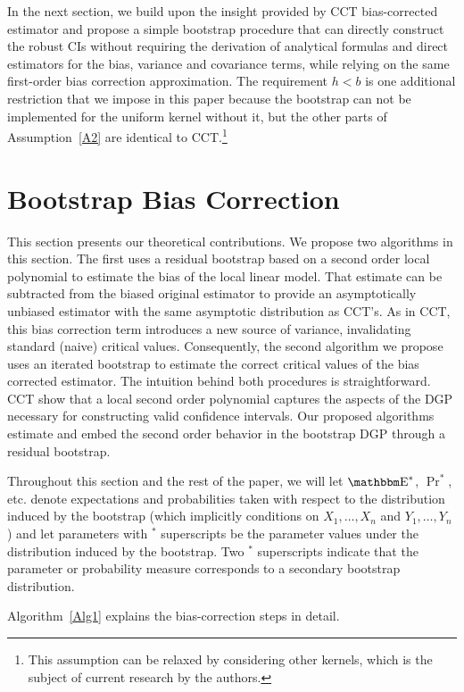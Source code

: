 \documentclass[12pt,fleqn]{article}
\begin{document}
In the next section, we build upon the insight provided by CCT bias-corrected
estimator and propose a simple bootstrap procedure that can directly construct
the robust CIs without requiring the derivation of analytical formulas and
direct estimators for the bias, variance and covariance terms, while relying on
the same first-order bias correction approximation. The requirement $h < b$ is
one additional restriction that we impose in this paper because the bootstrap
can not be implemented for the uniform kernel without it, but the other parts of
Assumption~\ref{A2} are identical to CCT.\footnote{%
  This assumption can be relaxed by considering other kernels, which is the
  subject of current research by the authors.} %

\section{Bootstrap Bias Correction}\label{boot}

This section presents our theoretical contributions. We propose two algorithms
in this section. The first uses a residual bootstrap based on a second
order local polynomial to estimate the bias of the local linear model. That
estimate can be subtracted from the biased original estimator to provide an
asymptotically unbiased estimator with the same asymptotic distribution as
CCT's. As in CCT, this bias correction term introduces a new source of variance,
invalidating standard (naive) critical values. Consequently, the second
algorithm we propose uses an iterated bootstrap to estimate the correct
critical values of the bias corrected estimator.
The intuition behind both procedures is straightforward. CCT show that a
local second order polynomial captures the aspects of the DGP
necessary for constructing valid confidence intervals. Our proposed algorithms
estimate and embed the second order behavior in the bootstrap DGP through a
residual bootstrap.

Throughout this section and the rest of the paper, we will
let $\E^{*}$, $\Pr^{*}$, etc. denote expectations and probabilities taken with
respect to the distribution induced by the bootstrap (which implicitly
conditions on $X_{1},\dots,X_{n}$ and $Y_{1},\dots,Y_{n}$) and let parameters with
$^{*}$ superscripts be the parameter values under the distribution induced by
the bootstrap. Two $^{*}$ superscripts indicate that the parameter or probability
measure corresponds to a secondary bootstrap distribution.

Algorithm~\ref{Alg1} explains the bias-correction steps in detail.
\end{document}

